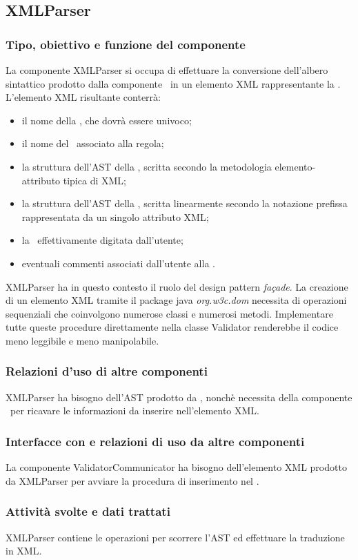 \subsection{XMLParser}%
\subsubsection{Tipo, obiettivo e funzione del componente}
La componente XMLParser si occupa di effettuare la conversione dell'albero sintattico prodotto dalla componente \brp\ in un elemento XML rappresentante la \br. L'elemento XML risultante conterr\`a:
\begin{itemize}
 \item il nome della \br, che dovr\`a essere univoco;
 \item il nome del \bo\ associato alla regola;
 \item la struttura dell'AST della \br, scritta secondo la metodologia elemento-attributo tipica di XML;
 \item la struttura dell'AST della \br, scritta linearmente secondo la notazione prefissa rappresentata da un singolo attributo XML;
 \item la \br\ effettivamente digitata dall'utente;
 \item eventuali commenti associati dall'utente alla \br.
\end{itemize}
XMLParser ha in questo contesto il ruolo del design pattern \textit{fa\c{c}ade}. La creazione di un elemento XML tramite il package java \textit{org.w3c.dom} necessita di operazioni sequenziali che coinvolgono numerose classi e numerosi metodi. Implementare tutte queste procedure direttamente nella classe Validator renderebbe il codice meno leggibile e meno manipolabile.
\subsubsection{Relazioni d'uso di altre componenti}
XMLParser ha bisogno dell'AST prodotto da \brp, nonch\`e necessita della componente \br\ per ricavare le informazioni da inserire nell'elemento XML.
\subsubsection{Interfacce con e relazioni di uso da altre componenti}
La componente ValidatorCommunicator ha bisogno dell'elemento XML prodotto da XMLParser per avviare la procedura di inserimento nel \rp.
\subsubsection{Attivit\`a svolte e dati trattati}
XMLParser contiene le operazioni per scorrere l'AST ed effettuare la traduzione in XML.

